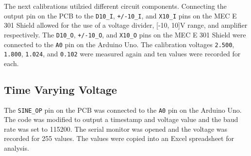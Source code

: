 The next calibrations utilzied different circuit components. Connecting the output pin on the PCB to the \texttt{D10\_I}, \texttt{+/-10\_I}, and \texttt{X10\_I} pins on 
the MEC E 301 Shield allowed for the use of a voltage divider, [-10, 10]V range, and amplifier respectively. The \texttt{D10\_O}, \texttt{+/-10\_O}, and \texttt{X10\_O} 
pins on the MEC E 301 Shield were connected to the \texttt{A0} pin on the Arduino Uno. The calibration voltages \texttt{2.500}, \texttt{1.800}, \texttt{1.024}, and \texttt{0.102}
were measured again and ten values were recorded for each.

\subsection{Time Varying Voltage}
\noindent The \texttt{SINE\_OP} pin on the PCB was connected to the \texttt{A0} pin on the Arduino Uno. The code was modified to output a timestamp and 
voltage value and the baud rate was set to 115200. The serial monitor was opened and the voltage was recorded for 255 values. The values were 
copied into an Excel spreadsheet for analysis.






